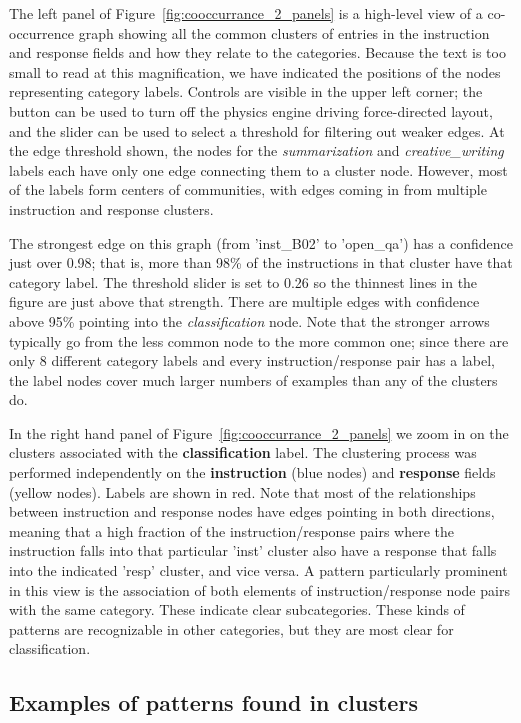 The left panel of Figure~\ref{fig:cooccurrance_2_panels} is a high-level view of a co-occurrence graph showing all the common clusters of entries in the instruction and response fields and how they relate to the categories. Because the text is too small to read at this magnification, we have indicated the positions of the nodes representing category labels. Controls are visible in the upper left corner; the button can be used to turn off the physics engine driving force-directed layout, and the slider can be used to select a threshold for filtering out weaker edges. At the edge threshold shown, the nodes for the \emph{summarization} and \emph{creative\_writing} labels each have only one edge connecting them to a cluster node. However, most of the labels form centers of communities, with edges coming in from multiple instruction and response clusters.

The strongest edge on this graph (from 'inst\_B02' to 'open\_qa') has a confidence just over 0.98; that is, more than 98\% of the instructions in that cluster have that category label. The threshold slider is set to 0.26 so the thinnest lines in the figure are just above that strength. There are multiple edges with confidence above 95\% pointing into the \emph{classification} node. Note that the stronger arrows typically go from the less common node to the more common one; since there are only 8 different category labels and every instruction/response pair has a label, the label nodes cover much larger numbers of examples than any of the clusters do.


In the right hand panel of Figure~\ref{fig:cooccurrance_2_panels} we zoom in on the clusters associated with the \textbf{classification} label. The clustering process was performed independently on the \textbf{instruction} (blue nodes) and \textbf{response} fields  (yellow nodes). Labels are shown in red. Note that most of the relationships between instruction and response nodes have edges pointing in both directions, meaning that a high fraction of the instruction/response pairs where the instruction falls into that particular 'inst' cluster also have a response that falls into the indicated 'resp' cluster, and vice versa. A pattern particularly prominent in this view is the association of both elements of instruction/response node pairs with the same category. These indicate clear subcategories. These kinds of patterns are recognizable in other categories, but they are most clear for classification.


\subsection{Examples of patterns found in clusters}

